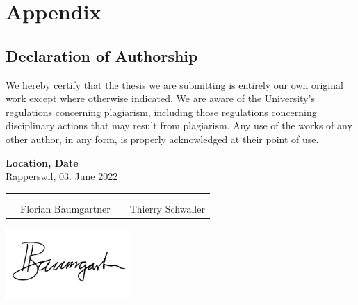 \chapter{Appendix}
\clearpage

\section{Declaration of Authorship} \label{Declaration of Authorship}
We hereby certify that the thesis we are submitting is entirely our own original work except where otherwise indicated. We are aware of the University’s regulations concerning plagiarism, including those regulations concerning disciplinary actions that may result from plagiarism. Any use of the works of any other author, in any form, is properly acknowledged at their point of use.

\bigskip
\textbf{Location, Date} \\
Rapperswil, 03. June 2022

\vspace{1.2cm}
\begin{tabular}{@{}p{0.1cm}p{6cm}p{0.6cm}p{6cm}@{}}
& \hrulefill & & \hrulefill\\ \\[-0.7em]
& Florian Baumgartner & & Thierry Schwaller\\
\end{tabular}

\includegraphics[width=4.8cm, align=t, smash=br, hshift=0.9cm, vshift=2.55cm]{appendix/Signature_Florian_Baumgartner.pdf}
\newpage

\iffalse

